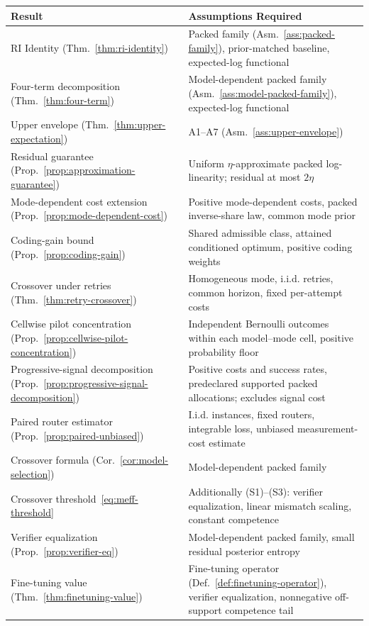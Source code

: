 \documentclass[10pt]{article}
\theoremstyle{paperplain}
\theoremstyle{paperdefinition}
\theoremstyle{paperremark}
\begin{document}
\begin{center}
\small
\renewcommand{\arraystretch}{1.2}
\begin{tabular}{@{}lp{7cm}@{}}
\toprule
\textbf{Result} & \textbf{Assumptions Required} \\
\midrule
RI Identity (Thm.~\ref{thm:ri-identity}) & Packed family (Asm.~\ref{ass:packed-family}), prior-matched baseline, expected-log functional \\
Four-term decomposition (Thm.~\ref{thm:four-term}) & Model-dependent packed family (Asm.~\ref{ass:model-packed-family}), expected-log functional \\
Upper envelope (Thm.~\ref{thm:upper-expectation}) & A1--A7 (Asm.~\ref{ass:upper-envelope}) \\
Residual guarantee (Prop.~\ref{prop:approximation-guarantee}) & Uniform $\eta$-approximate packed log-linearity; residual at most $2\eta$ \\
Mode-dependent cost extension (Prop.~\ref{prop:mode-dependent-cost}) & Positive mode-dependent costs, packed inverse-share law, common mode prior \\
Coding-gain bound (Prop.~\ref{prop:coding-gain}) & Shared admissible class, attained conditioned optimum, positive coding weights \\
Crossover under retries (Thm.~\ref{thm:retry-crossover}) & Homogeneous mode, i.i.d. retries, common horizon, fixed per-attempt costs \\
Cellwise pilot concentration (Prop.~\ref{prop:cellwise-pilot-concentration}) & Independent Bernoulli outcomes within each model--mode cell, positive probability floor \\
Progressive-signal decomposition (Prop.~\ref{prop:progressive-signal-decomposition}) & Positive costs and success rates, predeclared supported packed allocations; excludes signal cost \\
Paired router estimator (Prop.~\ref{prop:paired-unbiased}) & I.i.d. instances, fixed routers, integrable loss, unbiased measurement-cost estimate \\
Crossover formula (Cor.~\ref{cor:model-selection}) & Model-dependent packed family \\
Crossover threshold~\eqref{eq:meff-threshold} & Additionally (S1)--(S3): verifier equalization, linear mismatch scaling, constant competence \\
Verifier equalization (Prop.~\ref{prop:verifier-eq}) & Model-dependent packed family, small residual posterior entropy \\
Fine-tuning value (Thm.~\ref{thm:finetuning-value}) & Fine-tuning operator (Def.~\ref{def:finetuning-operator}), verifier equalization, nonnegative off-support competence tail \\

\end{tabular}
\end{center}
\end{document}
